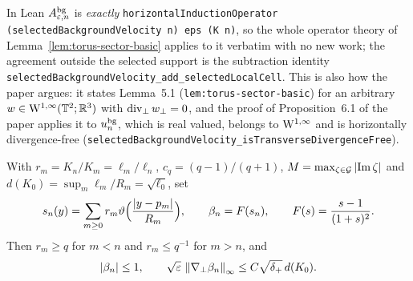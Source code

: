 In Lean $A^{\rm bg}_{\varepsilon,n}$ is \emph{exactly}
\texttt{horizontalInductionOperator (selectedBackgroundVelocity n) eps (K n)}, so the whole
operator theory of Lemma~\ref{lem:torus-sector-basic} applies to it verbatim with no new
work; the agreement outside the selected support is the subtraction identity
\texttt{selectedBackgroundVelocity\_add\_selectedLocalCell}.  This is also how the paper
argues: it states Lemma~5.1 (\texttt{lem:torus-sector-basic}) for an arbitrary
$w\in\mathrm{W}^{1,\infty}(\mathbb{T}^2;\mathbb{R}^3)$ with $\operatorname{div}_\perp w_\perp=0$, and the proof of
Proposition~6.1 of the paper applies it to $u_n^{\rm bg}$, which is real valued, belongs to
$\mathrm{W}^{1,\infty}$ and is horizontally divergence-free
(\texttt{selectedBackgroundVelocity\_isTransverseDivergenceFree}).

\begin{definition}
  \label{def:background:multiplier}
  \leanok
  With $r_m=K_n/K_m=\ell_m/\ell_n$, $c_q=(q-1)/(q+1)$,
  $M=\max_{\zeta\in\mathcal{G}}\left\lvert\operatorname{Im}\zeta\right\rvert$ and $d(K_0)=\sup_m\ell_m/R_m=\sqrt{\ell_0}$, set
  \begin{equation}
    s_n(y)=\sum_{m\geq0}r_m\vartheta\Bigl(\frac{\left\lvert y-p_m\right\rvert}{R_m}\Bigr),
    \qquad\beta_n=F(s_n),\qquad F(s)=\frac{s-1}{(1+s)^2}.
    \label{eq:background:multiplier}
  \end{equation}
  Then $r_m\geq q$ for $m<n$ and $r_m\leq q^{-1}$ for $m>n$, and
  \begin{equation}
    \left\lvert\beta_n\right\rvert\leq1,
    \qquad\sqrt{\varepsilon}\,\left\|\nabla_\perp\beta_n\right\|_\infty\leq C\sqrt{\delta_+}\,d(K_0).
    \label{eq:background:multiplier-bounds}
  \end{equation}
\end{definition}

